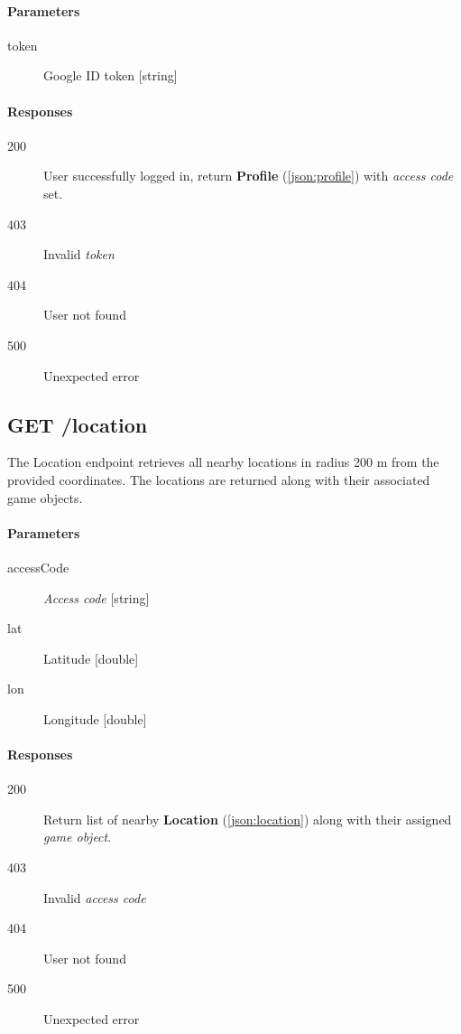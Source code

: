 		\paragraph*{Parameters}
		\begin{description}
			\item[token] Google ID token [string]
		\end{description}
		\paragraph*{Responses}
		\begin{description}
			\item[200] User successfully logged in, return \textbf{Profile} (\ref{json:profile}) with \textit{access code} set.
			\item[403] Invalid \textit{token}
			\item[404] User not found
			\item[500] Unexpected error
		\end{description}
	
	\subsection{GET /location}
		The Location endpoint retrieves all nearby locations in radius 200 m from the provided coordinates. The locations are returned along with their associated game objects.
		\paragraph*{Parameters}
		\begin{description}
			\item[accessCode] \textit{Access code} [string]
			\item[lat] Latitude [double]
			\item[lon] Longitude [double]
		\end{description}
		\paragraph*{Responses}
		\begin{description}
			\item[200] Return list of nearby \textbf{Location} (\ref{json:location}) along with their assigned \textit{game object}.
			\item[403] Invalid \textit{access code}
			\item[404] User not found
			\item[500] Unexpected error
		\end{description}